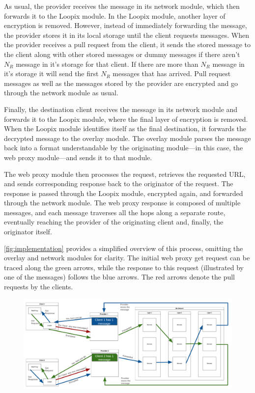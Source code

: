 \documentclass[a4paper,11pt,oneside]{report}
\begin{document}
As usual, the provider receives the message in its network module, which then forwards it to the Loopix module. In the Loopix module, another layer of encryption is removed. However, instead of immediately forwarding the message, the provider stores it in its local storage until the client requests messages. When the provider receives a pull request from the client, it sends the stored message to the client along with other stored messages or dummy messages if there aren't \(N_R\) message in it's storage for that client. If there are more than \(N_R\) message in it's storage it will send the first \(N_R\) messages that has arrived. Pull request messages as well as the messages stored by the provider are encrypted and go through the network module as usual.

Finally, the destination client receives the message in its network module and forwards it to the Loopix module, where the final layer of encryption is removed. When the Loopix module identifies itself as the final destination, it forwards the decrypted message to the overlay module. The overlay module parses the message back into a format understandable by the originating module—in this case, the web proxy module—and sends it to that module.

The web proxy module then processes the request, retrieves the requested URL, and sends corresponding response back to the originator of the request. The response is passed through the Loopix module, encrypted again, and forwarded through the network module. The web proxy response is composed of multiple messages, and each message traverses all the hops along a separate route, eventually reaching the provider of the originating client and, finally, the originator itself.

\autoref{fig:implementation} provides a simplified overview of this process, omitting the overlay and network modules for clarity. The initial web proxy get request can be traced along the green arrows, while the response to this request (illustrated by one of the messages) follows the blue arrows. The red arrows denote the pull requests by the clients.

\begin{figure}[H]
    \centering
    \includegraphics[width=1\linewidth]{plots/implementation.png}
    \caption{}
    \label{fig:implementation}
\end{figure}
\end{document}

